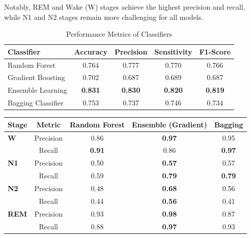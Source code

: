  Notably, REM and Wake (W) stages achieve the highest precision and recall, while N1 and N2 stages remain more challenging for all models.
\begin{table}[h!]
	\centering
	\begin{tabular}{lcccc}
		\toprule
		\textbf{Classifier} & \textbf{Accuracy} & \textbf{Precision} & \textbf{Sensitivity} & \textbf{F1-Score} \\
		\midrule
		Random Forest       & 0.764             & 0.777              & 0.770                & 0.766             \\
		Gradient Boosting   & 0.702             & 0.687              & 0.689                & 0.687             \\
		Ensemble Learning   & \textbf{0.831}    & \textbf{0.830}     & \textbf{0.820}       & \textbf{0.819}    \\
		Bagging Classifier  & 0.753             & 0.737              & 0.746                & 0.734             \\
		\bottomrule
	\end{tabular}
	\caption{ Performance Metrics of Classifiers}
\end{table}





\begin{table}[htbp]
	\centering
	
	\begin{tabular}{lcccc}
		\toprule
		\textbf{Stage} & \textbf{Metric} & \textbf{Random Forest} & \textbf{Ensemble (Gradient)} & \textbf{Bagging} \\
		\midrule
		\textbf{W}     & Precision       & 0.86                   & \textbf{0.97}                & 0.95             \\
		& Recall          & \textbf{0.91}          & 0.86                         & \textbf{0.97}    \\
		\textbf{N1}    & Precision       & 0.50                   & \textbf{0.57}                & 0.57             \\
		& Recall          & 0.59                   & \textbf{0.79}                & \textbf{0.79}    \\
		\textbf{N2}    & Precision       & 0.48                   & \textbf{0.68}                & 0.56             \\
		& Recall          & 0.44                   & \textbf{0.56}                & 0.41             \\
		\textbf{REM}   & Precision       & 0.93                   & \textbf{0.98}                & 0.87             \\
		& Recall          & 0.88                   & \textbf{0.97}                & 0.93             \\
		\bottomrule
	\end{tabular}

\end{table}




